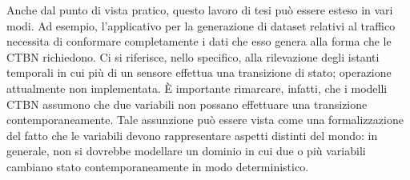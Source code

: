 Anche dal punto di vista pratico, questo lavoro di tesi può essere esteso in vari modi. Ad esempio, l'applicativo per la generazione di dataset relativi al traffico necessita di conformare completamente i dati che esso genera alla forma che le \acs{CTBN} richiedono. Ci si riferisce, nello specifico, alla rilevazione degli istanti temporali in cui più di un sensore effettua una transizione di stato; operazione attualmente non implementata. \`E importante rimarcare, infatti, che i modelli \acs{CTBN} assumono che due variabili non possano effettuare una transizione contemporaneamente. Tale assunzione può essere vista come una formalizzazione del fatto che le variabili devono rappresentare aspetti distinti del mondo: in generale, non si dovrebbe modellare un dominio in cui due o più variabili cambiano stato contemporaneamente in modo deterministico.
